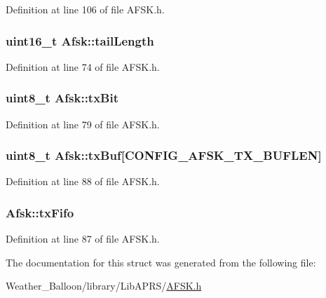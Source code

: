 Definition at line 106 of file A\+F\+S\+K.\+h.

\subsubsection[{\texorpdfstring{tail\+Length}{tailLength}}]{\setlength{\rightskip}{0pt plus 5cm}uint16\+\_\+t Afsk\+::tail\+Length}\hypertarget{struct_afsk_aa3297e8885c70332e9274679b9329937}{}\label{struct_afsk_aa3297e8885c70332e9274679b9329937}


Definition at line 74 of file A\+F\+S\+K.\+h.

\subsubsection[{\texorpdfstring{tx\+Bit}{txBit}}]{\setlength{\rightskip}{0pt plus 5cm}uint8\+\_\+t Afsk\+::tx\+Bit}\hypertarget{struct_afsk_a763bb48860d3ba79de2dd1abffa2ad89}{}\label{struct_afsk_a763bb48860d3ba79de2dd1abffa2ad89}


Definition at line 79 of file A\+F\+S\+K.\+h.

\subsubsection[{\texorpdfstring{tx\+Buf}{txBuf}}]{\setlength{\rightskip}{0pt plus 5cm}uint8\+\_\+t Afsk\+::tx\+Buf\mbox{[}{\bf C\+O\+N\+F\+I\+G\+\_\+\+A\+F\+S\+K\+\_\+\+T\+X\+\_\+\+B\+U\+F\+L\+EN}\mbox{]}}\hypertarget{struct_afsk_a32162873b8784efe43d3f28289c6ea6e}{}\label{struct_afsk_a32162873b8784efe43d3f28289c6ea6e}


Definition at line 88 of file A\+F\+S\+K.\+h.

\subsubsection[{\texorpdfstring{tx\+Fifo}{txFifo}}]{ Afsk\+::tx\+Fifo}\hypertarget{struct_afsk_a987e70d174e5cd82f73563d920273cc4}{}\label{struct_afsk_a987e70d174e5cd82f73563d920273cc4}


Definition at line 87 of file A\+F\+S\+K.\+h.



The documentation for this struct was generated from the following file\+:\begin{DoxyCompactItemize}
\item 
Weather\+\_\+\+Balloon/library/\+Lib\+A\+P\+R\+S/\hyperlink{_a_f_s_k_8h}{A\+F\+S\+K.\+h}\end{DoxyCompactItemize}
